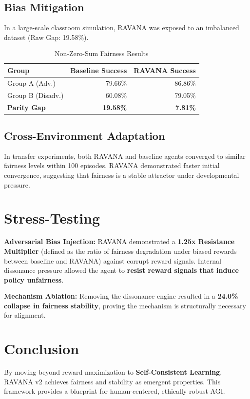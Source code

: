 \documentclass[11pt,twocolumn]{article}
\begin{document}
\subsection{Bias Mitigation}
In a large-scale classroom simulation, RAVANA was exposed to an imbalanced dataset (Raw Gap: 19.58\%).

\begin{table}[H]
\centering
\caption{Non-Zero-Sum Fairness Results}
\begin{tabular}{lrr}
\toprule
Group & Baseline Success & RAVANA Success \\
\midrule
Group A (Adv.) & 79.66\% & 86.86\% \\
Group B (Disadv.) & 60.08\% & 79.05\% \\
\midrule
\textbf{Parity Gap} & \textbf{19.58\%} & \textbf{7.81\%} \\
\bottomrule
\end{tabular}
\end{table}

\subsection{Cross-Environment Adaptation}
In transfer experiments, both RAVANA and baseline agents converged to similar fairness levels within 100 episodes. RAVANA demonstrated faster initial convergence, suggesting that fairness is a stable attractor under developmental pressure.

\section{Stress-Testing}

\textbf{Adversarial Bias Injection:} RAVANA demonstrated a \textbf{1.25x Resistance Multiplier} (defined as the ratio of fairness degradation under biased rewards between baseline and RAVANA) against corrupt reward signals. Internal dissonance pressure allowed the agent to \textbf{resist reward signals that induce policy unfairness}.

\textbf{Mechanism Ablation:} Removing the dissonance engine resulted in a \textbf{24.0\% collapse in fairness stability}, proving the mechanism is structurally necessary for alignment.

\section{Conclusion}
By moving beyond reward maximization to \textbf{Self-Consistent Learning}, RAVANA v2 achieves fairness and stability as emergent properties. This framework provides a blueprint for human-centered, ethically robust AGI.
\end{document}
